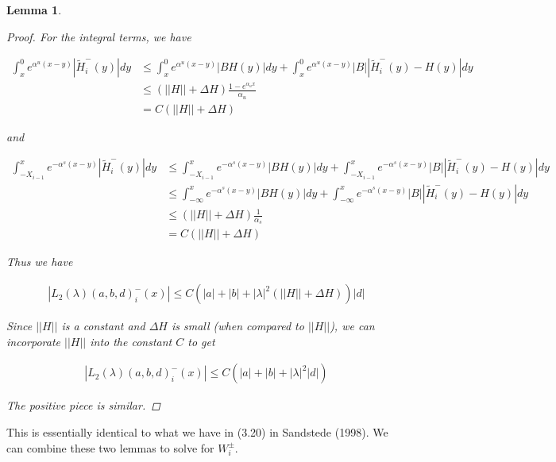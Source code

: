 \documentclass[12pt]{article}
\newtheorem{lemma}{Lemma}
\begin{document}
\begin{lemma}
\begin{proof}
For the integral terms, we have

\begin{align*}
\int_x^0 e^{\alpha^u (x - y)}|\tilde{H}_i^-(y)| dy &\leq \int_x^0 e^{\alpha^u (x - y)}|BH(y)| dy + \int_x^0 e^{\alpha^u (x - y)}|B||\tilde{H}_i^-(y) - H(y)| dy \\
&\leq (||H|| + \Delta H)\frac{1 - e^{\alpha_u x}}{\alpha_u} \\
&= C( ||H|| + \Delta H )
\end{align*}

and

\begin{align*}
\int_{-X_{i-1}}^x e^{-\alpha^s (x - y)}|\tilde{H}_i^-(y)| dy &\leq \int_{-X_{i-1}}^x e^{-\alpha^s (x - y)}|BH(y)| dy + \int_{-X_{i-1}}^x e^{-\alpha^s (x - y)}|B||\tilde{H}_i^-(y) - H(y)| dy \\
&\leq \int_{-\infty}^x e^{-\alpha^s (x - y)}|BH(y)| dy + \int_{-\infty}^x e^{-\alpha^s (x - y)}|B||\tilde{H}_i^-(y) - H(y)| dy \\
&\leq (||H|| + \Delta H)\frac{1}{\alpha_s} \\
&= C( ||H|| + \Delta H )
\end{align*}

Thus we have

\begin{align*}
| L_2(\lambda)(a, b, d)_i^-(x)| \leq C(|a| + |b| + |\lambda|^2 ( ||H|| + \Delta H ) )|d| 
\end{align*}

Since $||H||$ is a constant and $\Delta H$ is small (when compared to $||H||$), we can incorporate $||H||$ into the constant $C$ to get

\begin{align*}
| L_2(\lambda)(a, b, d)_i^-(x)| \leq C(|a| + |b| + |\lambda|^2 |d|) 
\end{align*}

The positive piece is similar.

\end{proof}

\end{lemma}

This is essentially identical to what we have in (3.20) in Sandstede (1998). We can combine these two lemmas to solve for $W_i^\pm$.
\end{document}

